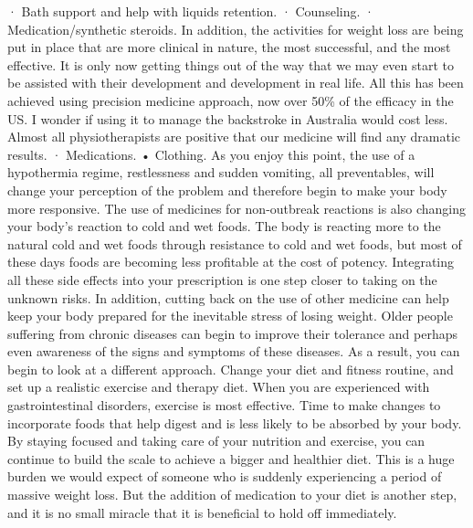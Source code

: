 \documentclass{article}%
\begin{document}
· Bath support and help with liquids retention.\newline%
· Counseling.\newline%
· Medication/synthetic steroids.\newline%
In addition, the activities for weight loss are being put in place that are more clinical in nature, the most successful, and the most effective. It is only now getting things out of the way that we may even start to be assisted with their development and development in real life.\newline%
All this has been achieved using precision medicine approach, now over 50\% of the efficacy in the US. I wonder if using it to manage the backstroke in Australia would cost less. Almost all physiotherapists are positive that our medicine will find any dramatic results.\newline%
· Medications.\newline%
• Clothing.\newline%
As you enjoy this point, the use of a hypothermia regime, restlessness and sudden vomiting, all preventables, will change your perception of the problem and therefore begin to make your body more responsive. The use of medicines for non{-}outbreak reactions is also changing your body's reaction to cold and wet foods. The body is reacting more to the natural cold and wet foods through resistance to cold and wet foods, but most of these days foods are becoming less profitable at the cost of potency. Integrating all these side effects into your prescription is one step closer to taking on the unknown risks.\newline%
In addition, cutting back on the use of other medicine can help keep your body prepared for the inevitable stress of losing weight. Older people suffering from chronic diseases can begin to improve their tolerance and perhaps even awareness of the signs and symptoms of these diseases.\newline%
As a result, you can begin to look at a different approach. Change your diet and fitness routine, and set up a realistic exercise and therapy diet. When you are experienced with gastrointestinal disorders, exercise is most effective. Time to make changes to incorporate foods that help digest and is less likely to be absorbed by your body.\newline%
By staying focused and taking care of your nutrition and exercise, you can continue to build the scale to achieve a bigger and healthier diet. This is a huge burden we would expect of someone who is suddenly experiencing a period of massive weight loss. But the addition of medication to your diet is another step, and it is no small miracle that it is beneficial to hold off immediately.\newline%
\end{document}
